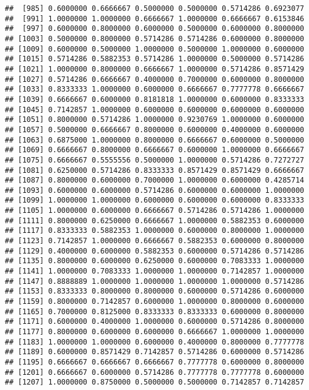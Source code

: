 \documentclass[]{article}
\begin{document}
\begin{verbatim}
##  [985] 0.6000000 0.6666667 0.5000000 0.5000000 0.5714286 0.6923077
##  [991] 1.0000000 1.0000000 0.6666667 1.0000000 0.6666667 0.6153846
##  [997] 0.6000000 0.8000000 0.6000000 0.5000000 0.6000000 0.8000000
## [1003] 0.5000000 0.8000000 0.5714286 0.5714286 0.6000000 0.8000000
## [1009] 0.6000000 0.5000000 1.0000000 0.5000000 1.0000000 0.6000000
## [1015] 0.5714286 0.5882353 0.5714286 1.0000000 0.5000000 0.5714286
## [1021] 1.0000000 0.8000000 0.6666667 1.0000000 0.5714286 0.8571429
## [1027] 0.5714286 0.6666667 0.4000000 0.7000000 0.6000000 0.8000000
## [1033] 0.8333333 1.0000000 0.6000000 0.6666667 0.7777778 0.6666667
## [1039] 0.6666667 0.6000000 0.8181818 1.0000000 0.6000000 0.8333333
## [1045] 0.7142857 1.0000000 0.6000000 0.6000000 0.6000000 0.6000000
## [1051] 0.8000000 0.5714286 1.0000000 0.9230769 1.0000000 0.6000000
## [1057] 0.5000000 0.6666667 0.8000000 0.6000000 0.4000000 0.6000000
## [1063] 0.6875000 1.0000000 0.8000000 0.6666667 0.6000000 0.5000000
## [1069] 0.6666667 0.8000000 0.6666667 0.6000000 1.0000000 0.6666667
## [1075] 0.6666667 0.5555556 0.5000000 1.0000000 0.5714286 0.7272727
## [1081] 0.6250000 0.5714286 0.8333333 0.8571429 0.8571429 0.6666667
## [1087] 0.8000000 0.6000000 0.7000000 1.0000000 0.6000000 0.4285714
## [1093] 0.6000000 0.6000000 0.5714286 0.6000000 0.6000000 1.0000000
## [1099] 1.0000000 1.0000000 0.6000000 0.6000000 0.6000000 0.8333333
## [1105] 1.0000000 0.6000000 0.6666667 0.5714286 0.5714286 1.0000000
## [1111] 0.8000000 0.6250000 0.6666667 1.0000000 0.5882353 0.6000000
## [1117] 0.8333333 0.5882353 1.0000000 0.6000000 0.8000000 1.0000000
## [1123] 0.7142857 1.0000000 0.6666667 0.5882353 0.6000000 0.8000000
## [1129] 0.4000000 0.6000000 0.5882353 0.6000000 0.5714286 0.5714286
## [1135] 0.8000000 0.6000000 0.6250000 0.6000000 0.7083333 1.0000000
## [1141] 1.0000000 0.7083333 1.0000000 1.0000000 0.7142857 1.0000000
## [1147] 0.8888889 1.0000000 1.0000000 1.0000000 1.0000000 0.5714286
## [1153] 0.8333333 0.8000000 0.8000000 0.6000000 0.5714286 0.6000000
## [1159] 0.8000000 0.7142857 0.6000000 1.0000000 0.8000000 0.6000000
## [1165] 0.7000000 0.8125000 0.8333333 0.8333333 0.6000000 0.8000000
## [1171] 0.6000000 0.4000000 1.0000000 0.6000000 0.5714286 0.8000000
## [1177] 0.8000000 0.6000000 0.6000000 0.6666667 1.0000000 1.0000000
## [1183] 1.0000000 1.0000000 0.6000000 0.4000000 0.8000000 0.7777778
## [1189] 0.6000000 0.8571429 0.7142857 0.5714286 0.6000000 0.5714286
## [1195] 0.6666667 0.6666667 0.6666667 0.7777778 0.6000000 0.8000000
## [1201] 0.6666667 0.6000000 0.5714286 0.7777778 0.7777778 0.6000000
## [1207] 1.0000000 0.8750000 0.5000000 0.5000000 0.7142857 0.7142857

\end{verbatim}
\end{document}
